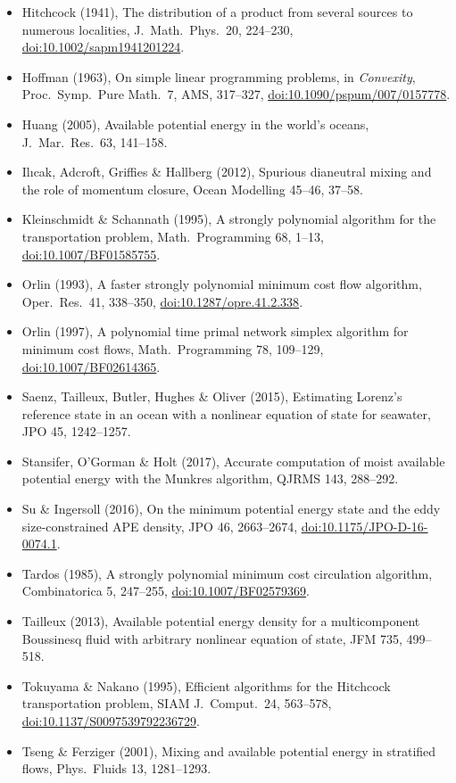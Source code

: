 \documentclass[11pt,a4paper]{article}
\newcommand{\doi}[1]{\href{https://doi.org/#1}{doi:#1}}
\begin{document}
\begin{itemize}
  \item Hitchcock (1941), The distribution of a product from several sources to numerous localities, J.\ Math.\ Phys.\ 20,
        224--230, \doi{10.1002/sapm1941201224}.
  \item Hoffman (1963), On simple linear programming problems, in \emph{Convexity}, Proc.\ Symp.\ Pure Math.\ 7, AMS,
        317--327, \doi{10.1090/pspum/007/0157778}.
  \item Huang (2005), Available potential energy in the world's oceans, J.\ Mar.\ Res.\ 63, 141--158.
  \item Il{\i}cak, Adcroft, Griffies \& Hallberg (2012), Spurious dianeutral mixing and the role of momentum closure, Ocean
        Modelling 45--46, 37--58.
  \item Kleinschmidt \& Schannath (1995), A strongly polynomial algorithm for the transportation problem, Math.\ Programming
        68, 1--13, \doi{10.1007/BF01585755}.
  \item Orlin (1993), A faster strongly polynomial minimum cost flow algorithm, Oper.\ Res.\ 41, 338--350,
        \doi{10.1287/opre.41.2.338}.
  \item Orlin (1997), A polynomial time primal network simplex algorithm for minimum cost flows, Math.\ Programming 78,
        109--129, \doi{10.1007/BF02614365}.
  \item Saenz, Tailleux, Butler, Hughes \& Oliver (2015), Estimating Lorenz's reference state in an ocean with a nonlinear
        equation of state for seawater, JPO 45, 1242--1257.
  \item Stansifer, O'Gorman \& Holt (2017), Accurate computation of moist available potential energy with the Munkres
        algorithm, QJRMS 143, 288--292.
  \item Su \& Ingersoll (2016), On the minimum potential energy state and the eddy size-constrained APE density, JPO 46,
        2663--2674, \doi{10.1175/JPO-D-16-0074.1}.
  \item Tardos (1985), A strongly polynomial minimum cost circulation algorithm, Combinatorica 5, 247--255,
        \doi{10.1007/BF02579369}.
  \item Tailleux (2013), Available potential energy density for a multicomponent Boussinesq fluid with arbitrary nonlinear
        equation of state, JFM 735, 499--518.
  \item Tokuyama \& Nakano (1995), Efficient algorithms for the Hitchcock transportation problem, SIAM J.\ Comput.\ 24,
        563--578, \doi{10.1137/S0097539792236729}.
  \item Tseng \& Ferziger (2001), Mixing and available potential energy in stratified flows, Phys.\ Fluids 13, 1281--1293.

\end{itemize}
\end{document}
